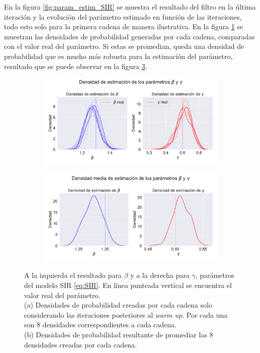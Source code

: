 En la figura \ref{fig:param_estim_SIR} se muestra el resultado del filtro en la última iteración y la evolución del parámetro estimado en función de las iteraciones, todo esto solo para la primera cadena de manera ilustrativa. En la figura \ref{fig:density_param_estim_SIR} se muestran las densidades de probabilidad generadas por cada cadena, comparadas con el valor real del parámetro. Si estas se promedian, queda una densidad de probabilidad que es mucho más robusta para la estimación del parámetro, resultado que se puede observar en la figura \ref{fig:mean_density_param_estim_SIR}.



\begin{figure}[h!]
    \centering
    \begin{subfigure}[b]{0.8\textwidth}
        \includegraphics[width=\linewidth]{img/content/chapter4/nonlinear_filters_sir_params_density.pdf}
        \caption{}
        \label{fig:density_param_estim_SIR}
    \end{subfigure}
    \begin{subfigure}[b]{0.8\textwidth}
        \includegraphics[width=\linewidth]{img/content/chapter4/nonlinear_filters_sir_params_density_mean.pdf}
        \caption{}
        \label{fig:mean_density_param_estim_SIR}
    \end{subfigure}
    \caption{A la izquierda el resultado para $\beta$ y a la derecha para $\gamma$, parámetros del modelo SIR \eqref{eq:SIR}. En línea punteada vertical se encuentra el valor real del parámetro. \\
    (a) Densidades de probabilidad creadas por cada cadena solo considerando las iteraciones posteriores al \textit{warm up}. Por cada una son $8$ densidades correspondientes a cada cadena. \\
    (b) Densidades de probabilidad resultante de promediar las $8$ densidades creadas por cada cadena.}
    
\end{figure}

